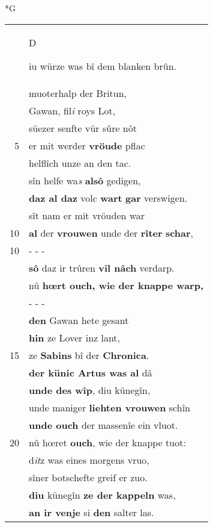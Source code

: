 \documentclass[8pt,a4paper,notitlepage]{article}
\begin{document}
\begin{table}[ht]
\begin{minipage}[t]{0.5\linewidth}
\small
\begin{center}*G
\end{center}
\begin{tabular}{rl}
 & \begin{large}D\end{large}iu würze was bî dem blanken brûn.\\ 
 & muoterhalp der Britun,\\ 
 & Gawan, fil\textit{i} roys Lot,\\ 
 & süezer senfte vür sûre nôt\\ 
5 & er mit werder \textbf{vröude} pflac\\ 
 & helflîch unze an den tac.\\ 
 & sîn helfe wa\textit{s} \textbf{alsô} gedigen,\\ 
 & \textbf{daz al daz} volc \textbf{wart} \textbf{gar} verswigen.\\ 
 & sît nam er mit vröuden war\\ 
10 & \textbf{al} der \textbf{vrouwen} unde der \textbf{rîter} \textbf{schar},\\ 
10 & \multicolumn{1}{l}{ - - - }\\ 
 & \textbf{sô} daz ir trûren \textbf{vil nâch} verdarp.\\ 
 & nû \textbf{hœrt ouch, wie der knappe warp,}\\ 
 & \multicolumn{1}{l}{ - - - }\\ 
 & \textbf{den} Gawan hete gesant\\ 
 & \textbf{hin} ze Lover inz lant,\\ 
15 & ze \textbf{Sabins} bî der \textbf{Chronica}.\\ 
 & \textbf{der künic Artus was al} dâ\\ 
 & \textbf{unde des wîp}, diu künegîn,\\ 
 & unde maniger \textbf{liehten vrouwen} schîn\\ 
 & \textbf{unde ouch} der massenîe ein vluot.\\ 
20 & nû hœret \textbf{ouch}, wie der knappe tuot:\\ 
 & d\textit{it}z was eines morgens vruo,\\ 
 & sîner botschefte greif er zuo.\\ 
 & \textbf{diu} künegîn \textbf{ze der kappeln} was,\\ 
 & \textbf{an ir venje} si \textbf{den} salter las.\\ 

\end{tabular}
\end{minipage}
\end{table}
\end{document}
